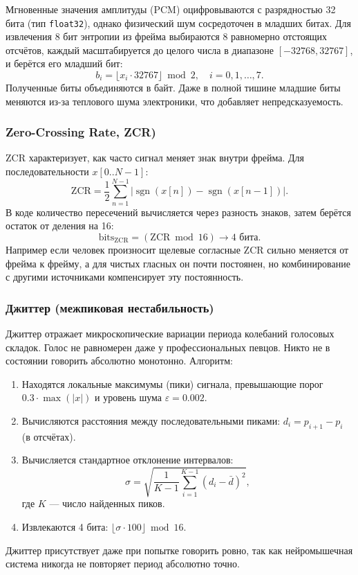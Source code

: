 \documentclass[14pt, a4paper]{extreport}
\begin{document}
Мгновенные значения амплитуды (PCM) оцифровываются с разрядностью 32 бита (тип \texttt{float32}), однако физический шум сосредоточен в младших битах. Для извлечения 8 бит энтропии из фрейма выбираются 8 равномерно отстоящих отсчётов, каждый масштабируется до целого числа в диапазоне $[-32768, 32767]$, и берётся его младший бит:
\[
b_i = \lfloor x_i \cdot 32767 \rfloor \bmod 2,\quad i = 0, 1, \dots, 7.
\]
Полученные биты объединяются в байт. Даже в полной тишине младшие биты меняются из-за теплового шума электроники, что добавляет непредсказуемость.

\subsubsection{Zero-Crossing Rate, ZCR)}

ZCR характеризует, как часто сигнал меняет знак внутри фрейма. Для последовательности $x[0..N-1]$:
\[
\mathrm{ZCR} = \frac{1}{2}\sum_{n=1}^{N-1} \bigl| \operatorname{sgn}(x[n]) - \operatorname{sgn}(x[n-1]) \bigr|.
\]
В коде количество пересечений вычисляется через разность знаков, затем берётся остаток от деления на 16:
\[
\mathrm{bits}_{\mathrm{ZCR}} = (\mathrm{ZCR} \bmod 16) \rightarrow 4\text{ бита}.
\]
Например если человек произносит щелевые согласные ZCR сильно меняется от фрейма к фрейму, а для чистых гласных он почти постоянен, но комбинирование с другими источниками компенсирует эту постоянность.

\subsubsection{Джиттер (межпиковая нестабильность)}

Джиттер отражает микроскопические вариации периода колебаний голосовых складок.
Голос не равномерен даже у профессиональных певцов. Никто не в состоянии говорить абсолютно монотонно. 
Алгоритм:
\begin{enumerate}
    \item Находятся локальные максимумы (пики) сигнала, превышающие порог $0.3 \cdot \max(|x|)$ и уровень шума $\varepsilon = 0.002$.
    \item Вычисляются расстояния между последовательными пиками: $d_i = p_{i+1} - p_i$ (в отсчётах).
    \item Вычисляется стандартное отклонение интервалов:
    \[
    \sigma = \sqrt{\frac{1}{K-1}\sum_{i=1}^{K-1} (d_i - \bar d)^2},
    \]
    где $K$ — число найденных пиков.
    \item Извлекаются 4 бита: $\lfloor \sigma \cdot 100 \rfloor \bmod 16$.
\end{enumerate}
Джиттер присутствует даже при попытке говорить ровно, так как нейромышечная система никогда не повторяет период абсолютно точно.
\end{document}
